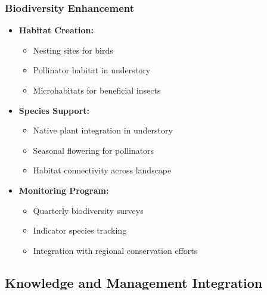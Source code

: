 \subsubsection{Biodiversity Enhancement}
\begin{itemize}
    \item \textbf{Habitat Creation:}
    \begin{itemize}
        \item Nesting sites for birds
        \item Pollinator habitat in understory
        \item Microhabitats for beneficial insects
    \end{itemize}
    \item \textbf{Species Support:}
    \begin{itemize}
        \item Native plant integration in understory
        \item Seasonal flowering for pollinators
        \item Habitat connectivity across landscape
    \end{itemize}
    \item \textbf{Monitoring Program:}
    \begin{itemize}
        \item Quarterly biodiversity surveys
        \item Indicator species tracking
        \item Integration with regional conservation efforts
    \end{itemize}
\end{itemize}

\subsection{Knowledge and Management Integration}

